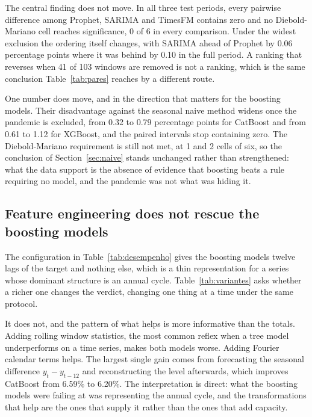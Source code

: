 The central finding does not move. In all three test periods, every pairwise difference among
Prophet, SARIMA and TimesFM contains zero and no Diebold-Mariano cell reaches significance,
0 of 6 in every comparison. Under the widest exclusion the ordering itself changes, with
SARIMA ahead of Prophet by 0.06 percentage points where it was behind by 0.10 in the full
period. A ranking that reverses when 41 of 103 windows are removed is not a ranking, which is
the same conclusion Table~\ref{tab:pares} reaches by a different route.

One number does move, and in the direction that matters for the boosting models. Their
disadvantage against the seasonal naive method widens once the pandemic is excluded, from
0.32 to 0.79 percentage points for CatBoost and from 0.61 to 1.12 for XGBoost, and
the paired intervals stop containing zero. The Diebold-Mariano requirement is still not met,
at 1 and 2 cells of six, so the conclusion of Section~\ref{sec:naive} stands unchanged rather
than strengthened: what the data support is the absence of evidence that boosting beats a
rule requiring no model, and the pandemic was not what was hiding it.



\subsection{Feature engineering does not rescue the boosting models}



The configuration in Table~\ref{tab:desempenho} gives the boosting models twelve lags of the
target and nothing else, which is a thin representation for a series whose dominant structure
is an annual cycle. Table~\ref{tab:variantes} asks whether a richer one changes the verdict,
changing one thing at a time under the same protocol.

It does not, and the pattern of what helps is more informative than the totals. Adding
rolling window statistics, the most common reflex when a tree model underperforms on a time
series, makes both models worse. Adding Fourier calendar terms helps. The largest single
gain comes from forecasting the seasonal difference $y_t - y_{t-12}$ and reconstructing the
level afterwards, which improves CatBoost from 6.59\% to 6.20\%. The interpretation is
direct: what the boosting models were failing at was representing the annual cycle, and the
transformations that help are the ones that supply it rather than the ones that add capacity.

